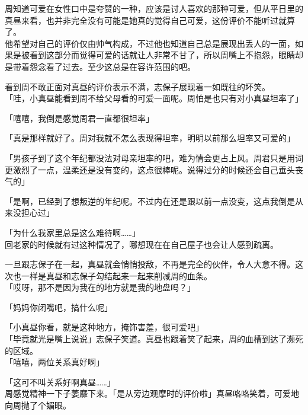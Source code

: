 周知道可爱在女性口中是夸赞的一种，应该是讨人喜欢的那种可爱，但从平日里的真昼来看，也并非完全没有可能是她真的觉得自己可爱，这份评价不能听过就算了。\\

他希望对自己的评价仅由帅气构成，不过他也知道自己总是展现出丢人的一面，如果是被看到这部分而觉得可爱的话就让人非常不甘了，所以周嘴上不抱怨，眼睛却是带着怨念看了过去。至少这总是在容许范围的吧。

看到周不敢正面对真昼的评价表示不满，志保子展现着一如既往的坏笑。\\

「哇，小真昼能看到周不给父母看的可爱一面呢。周怕是也只有对小真昼坦率了」

「嘻嘻，我倒是感觉周君一直都很坦率」

「真是那样就好了。周对我就不怎么表现得坦率，明明以前那么坦率又可爱的」

「男孩子到了这个年纪都没法对母亲坦率的吧，难为情会更占上风。周君只是用词更激烈了一点，温柔还是没有变的，这点很棒呢。说得过分的时候还会自己垂头丧气的」

「是啊，已经到了想叛逆的年纪呢。不过内在还是跟以前一点没变，这点我倒是从来没担心过」

「为什么我家里总是这么难待啊……」\\

回老家的时候就有过这种情况了，哪想现在在自己屋子也会让人感到疏离。

一旦跟志保子在一起，真昼就会悄悄投敌，不再是完全的伙伴，令人大意不得。这次也一样是真昼和志保子勾结起来一起来削减周的血条。\\

「哎呀，那不是因为我在的地方就是我的地盘吗？」

「妈妈你闭嘴吧，搞什么呢」

「小真昼你看，就是这种地方，掩饰害羞，很可爱吧」\\

「毕竟就光是嘴上说说」志保子笑道。真昼也跟着笑了起来，周的血槽到达了濒死的区域。\\

「嘻嘻，两位关系真好啊」

「这可不叫关系好啊真昼……」\\

周感觉精神一下子萎靡下来。「是从旁边观摩时的评价啦」真昼咯咯笑着，可爱地向周抛了个媚眼。
